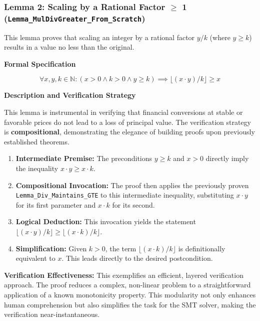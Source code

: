 \documentclass[
  english,
  onecolumn]{article}
\providecommand{\tightlist}{%
  \setlength{\itemsep}{0pt}\setlength{\parskip}{0pt}}
\begin{document}
\subsubsection{\texorpdfstring{\textbf{Lemma 2: Scaling by a Rational
Factor \(\geq\) 1
(\texttt{Lemma\_MulDivGreater\_From\_Scratch})}}{Lemma 2: Scaling by a Rational Factor \textbackslash geq 1 (Lemma\_MulDivGreater\_From\_Scratch)}}\label{lemma-2-scaling-by-a-rational-factor-geq-1-lemma_muldivgreater_from_scratch}

This lemma proves that scaling an integer by a rational factor \(y/k\)
(where \(y \ge k\)) results in a value no less than the original.

\textbf{Formal Specification}

\[
\forall x, y, k \in \mathbb{N} : (x > 0 \land k > 0 \land y \ge k) \implies \lfloor (x \cdot y) / k \rfloor \ge x
\]

\textbf{Description and Verification Strategy}

This lemma is instrumental in verifying that financial conversions at
stable or favorable prices do not lead to a loss of principal value. The
verification strategy is \textbf{compositional}, demonstrating the
elegance of building proofs upon previously established theorems.

\begin{enumerate}
\def\labelenumi{\arabic{enumi}.}
\tightlist
\item
  \textbf{Intermediate Premise:} The preconditions \(y \ge k\) and
  \(x > 0\) directly imply the inequality \(x \cdot y \ge x \cdot k\).
\item
  \textbf{Compositional Invocation:} The proof then applies the
  previously proven \texttt{Lemma\_Div\_Maintains\_GTE} to this
  intermediate inequality, substituting \(x \cdot y\) for its first
  parameter and \(x \cdot k\) for its second.
\item
  \textbf{Logical Deduction:} This invocation yields the statement
  \(\lfloor(x \cdot y)/k\rfloor \ge \lfloor(x \cdot k)/k\rfloor\).
\item
  \textbf{Simplification:} Given \(k > 0\), the term
  \(\lfloor(x \cdot k)/k\rfloor\) is definitionally equivalent to \(x\).
  This leads directly to the desired postcondition.
\end{enumerate}

\textbf{Verification Effectiveness:} This exemplifies an efficient,
layered verification approach. The proof reduces a complex, non-linear
problem to a straightforward application of a known monotonicity
property. This modularity not only enhances human comprehension but also
simplifies the task for the SMT solver, making the verification
near-instantaneous.
\end{document}
